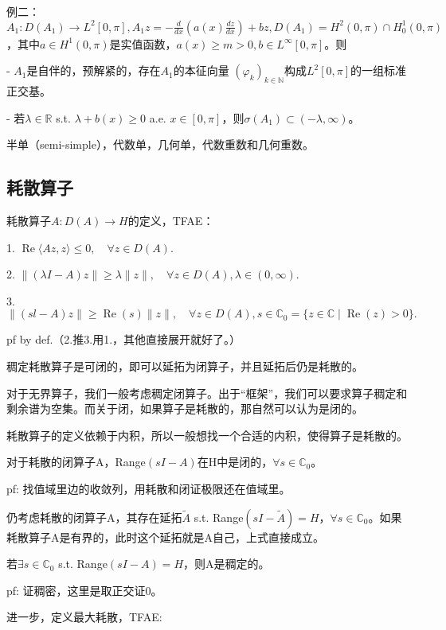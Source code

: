 例二：$A_{1}: D\left(A_{1}\right) \to L^{2}[0, \pi], A_{1} z=-\frac{d}{d x}\left(a(x) \frac{d z}{d x}\right)+b z, D\left(A_{1}\right)=H^{2}(0, \pi) \cap H_{0}^{1}(0, \pi)$，其中$ a \in H^{1}(0, \pi)$是实值函数，$a(x) \geq m>0, b \in L^{\infty}[0, \pi]$。则

- $A_{1}$是自伴的，预解紧的，存在$A_{1}$的本征向量  $\left(\varphi_{k}\right)_{k \in \mathbb{N}}$构成$L^{2}[0, \pi]$的一组标准正交基。

- 若$\lambda \in \mathbb{R}$ s.t. $\lambda+b(x) \geq 0$ a.e. $x \in[0, \pi]$，则$\sigma\left(A_{1}\right) \subset(-\lambda, \infty)$。

半单（semi-simple），代数单，几何单，代数重数和几何重数。

\subsection{耗散算子}

耗散算子$A: D(A) \to H$的定义，TFAE：

1. $\operatorname{Re}\langle A z, z\rangle \leq 0, \quad \forall z \in D(A) .$

2. $\|(\lambda I-A) z\| \geq \lambda\|z\|, \quad \forall z \in D(A), \lambda \in(0, \infty) .
$

3. $\|(s l-A) z\| \geq \operatorname{Re}(s) \|z\|, \quad \forall z \in D(A), s \in \mathbb{C}_{0} = \{ z \in \mathbb{C} \mid \operatorname{Re}(z) > 0 \} .
$

pf by def.（2.推3.用1.，其他直接展开就好了。）

稠定耗散算子是可闭的，即可以延拓为闭算子，并且延拓后仍是耗散的。

对于无界算子，我们一般考虑稠定闭算子。出于“框架”，我们可以要求算子稠定和剩余谱为空集。而关于闭，如果算子是耗散的，那自然可以认为是闭的。

耗散算子的定义依赖于内积，所以一般想找一个合适的内积，使得算子是耗散的。

对于耗散的闭算子A，Range$(sI - A)$在H中是闭的，$\forall s \in \mathbb{C}_0$。

pf: 找值域里边的收敛列，用耗散和闭证极限还在值域里。

仍考虑耗散的闭算子A，其存在延拓$\tilde{A}$ s.t. Range$(sI - \tilde{A}) = H$，$\forall s \in \mathbb{C}_0$。如果耗散算子A是有界的，此时这个延拓就是A自己，上式直接成立。

若$\exists s \in \mathbb{C}_0$ s.t. Range$(sI - A) = H$，则A是稠定的。

pf: 证稠密，这里是取正交证0。

进一步，定义最大耗散，TFAE:

